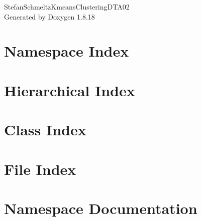 \let\mypdfximage\pdfximage\def\pdfximage{\immediate\mypdfximage}\documentclass[twoside]{book}
\newcommand{\+}{\discretionary{\mbox{\scriptsize$\hookleftarrow$}}{}{}}
\newcommand{\clearemptydoublepage}{%
  \newpage{\pagestyle{empty}\cleardoublepage}%
}
\begin{document}
\hypersetup{pageanchor=false,
             bookmarksnumbered=true,
             pdfencoding=unicode
            }
\begin{titlepage}
\vspace*{7cm}
\begin{center}%
{\Large Stefan\+Schmeltz\+Kmeans\+Clustering\+D\+T\+A02 }\\
\vspace*{1cm}
{\large Generated by Doxygen 1.8.18}\\
\end{center}
\end{titlepage}
\clearemptydoublepage
{}
\tableofcontents
\clearemptydoublepage
{}
\hypersetup{pageanchor=true}

\chapter{Namespace Index}

\chapter{Hierarchical Index}

\chapter{Class Index}

\chapter{File Index}

\chapter{Namespace Documentation}








\end{document}
